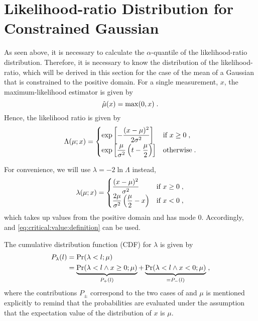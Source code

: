 \documentclass[a4paper]{article}
\newcommand*\Prob{\mathrm{Pr}}
\begin{document}
\section{Likelihood-ratio Distribution for Constrained Gaussian}

As seen above, it is necessary to calculate the $\alpha$-quantile of the
likelihood-ratio distribution. Therefore, it is necessary to know the
distribution of the likelihood-ratio, which will be derived in this
section for the case of the mean of a Gaussian that is constrained to
the positive domain. For a single measurement, $x$, the
maximum-likelihood estimator is given by\cite{Feldman1998}
%
\begin{equation*}
  \hat\mu(x) = \max(0, x)
  \;.
\end{equation*}
%
Hence, the likelihood ratio is given by
%
\begin{equation*}
  \Lambda(\mu; x) = 
  \begin{cases}
    \displaystyle
    \exp\left[ - \frac{(x-\mu)^2}{2\sigma^2} \right] & \text{if } x \geq 0
    \;,
    \\
    \displaystyle
    \exp\left[ \frac{\mu}{\sigma^2} \left( t - \frac{\mu}{2} \right) \right] & \text{otherwise}
    \;.
  \end{cases}
\end{equation*}
%

For convenience, we will use $\lambda=-2\ln\Lambda$ instead,
%
\begin{equation}
  \label{eq:log:likelihood:ratio}
  \lambda(\mu; x) = 
  \begin{cases}
    \displaystyle
     \frac{(x-\mu)^2}{\sigma^2} & \text{if } x \geq 0
    \;,
    \\
    \displaystyle
    \frac{2\mu}{\sigma^2} \left( \frac{\mu}{2} - x \right) & \text{if } x < 0
    \;,
  \end{cases}
\end{equation}
%
which takes up values from the positive domain and has mode 0.
Accordingly,  and
\eqref{eq:critical:value:definition} can be used.

The cumulative distribution function (CDF) for $\lambda$ is given by
\begin{align*}
  P_\lambda(l) & = \Prob(\lambda < l; \mu) \\
  & =
  \underbrace{\Prob(\lambda < l \wedge x \geq 0; \mu)}_{P_+(l)}
  +
  \underbrace{\Prob(\lambda < l \wedge x < 0; \mu)}_{=P_-(l)}
  \fcomma
\end{align*}
where the contributions $P_\pm$ correspond to the two cases of
 and $\mu$ is mentioned explicitly to
remind that the probabilities are evaluated under the assumption that
the expectation value of the distribution of $x$ is $\mu$.
\end{document}
